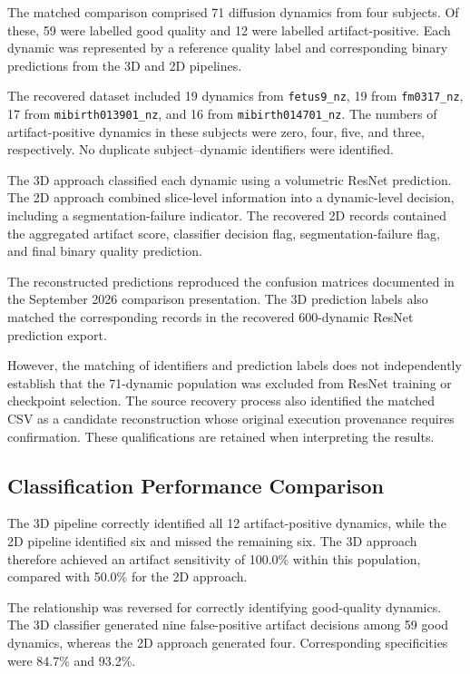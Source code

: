 The matched comparison comprised 71 diffusion dynamics from four subjects. Of these, 59 were labelled good quality and 12 were labelled artifact-positive. Each dynamic was represented by a reference quality label and corresponding binary predictions from the 3D and 2D pipelines.

The recovered dataset included 19 dynamics from \texttt{fetus9\_nz}, 19 from \texttt{fm0317\_nz}, 17 from \texttt{mibirth013901\_nz}, and 16 from \texttt{mibirth014701\_nz}. The numbers of artifact-positive dynamics in these subjects were zero, four, five, and three, respectively. No duplicate subject--dynamic identifiers were identified.

The 3D approach classified each dynamic using a volumetric ResNet prediction. The 2D approach combined slice-level information into a dynamic-level decision, including a segmentation-failure indicator. The recovered 2D records contained the aggregated artifact score, classifier decision flag, segmentation-failure flag, and final binary quality prediction.

The reconstructed predictions reproduced the confusion matrices documented in the September 2026 comparison presentation. The 3D prediction labels also matched the corresponding records in the recovered 600-dynamic ResNet prediction export.

However, the matching of identifiers and prediction labels does not independently establish that the 71-dynamic population was excluded from ResNet training or checkpoint selection. The source recovery process also identified the matched CSV as a candidate reconstruction whose original execution provenance requires confirmation. These qualifications are retained when interpreting the results.

\subsection{Classification Performance Comparison}
\label{subsec:results_matched_pipeline_metrics}

The 3D pipeline correctly identified all 12 artifact-positive dynamics, while the 2D pipeline identified six and missed the remaining six. The 3D approach therefore achieved an artifact sensitivity of 100.0\% within this population, compared with 50.0\% for the 2D approach.

The relationship was reversed for correctly identifying good-quality dynamics. The 3D classifier generated nine false-positive artifact decisions among 59 good dynamics, whereas the 2D approach generated four. Corresponding specificities were 84.7\% and 93.2\%.

